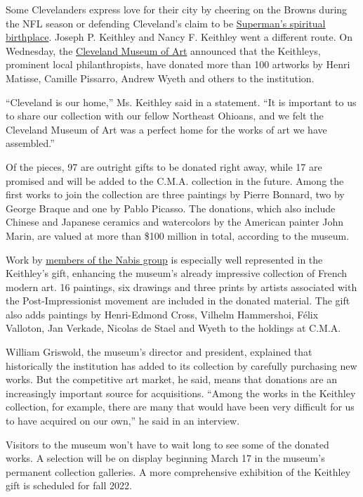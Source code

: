 Some Clevelanders express love for their city by cheering on the Browns
during the NFL season or defending Cleveland's claim to be
\href{https://www.nytimes3xbfgragh.onion/2008/09/02/us/02superman.html}{Superman's
spiritual birthplace}. Joseph P. Keithley and Nancy F. Keithley went a
different route. On Wednesday, the
\href{https://www.clevelandart.org/}{Cleveland Museum of Art} announced
that the Keithleys, prominent local philanthropists, have donated more
than 100 artworks by Henri Matisse, Camille Pissarro, Andrew Wyeth and
others to the institution.

``Cleveland is our home,'' Ms. Keithley said in a statement. ``It is
important to us to share our collection with our fellow Northeast
Ohioans, and we felt the Cleveland Museum of Art was a perfect home for
the works of art we have assembled.''

Of the pieces, 97 are outright gifts to be donated right away, while 17
are promised and will be added to the C.M.A. collection in the future.
Among the first works to join the collection are three paintings by
Pierre Bonnard, two by George Braque and one by Pablo Picasso. The
donations, which also include Chinese and Japanese ceramics and
watercolors by the American painter John Marin, are valued at more than
\$100 million in total, according to the museum.

Work by \href{https://www.clevelandart.org/art/1953.212}{members of the
Nabis group} is especially well represented in the Keithley's gift,
enhancing the museum's already impressive collection of French modern
art. 16 paintings, six drawings and three prints by artists associated
with the Post-Impressionist movement are included in the donated
material. The gift also adds paintings by Henri-Edmond Cross, Vilhelm
Hammershoi, Félix Valloton, Jan Verkade, Nicolas de Stael and Wyeth to
the holdings at C.M.A.

William Griswold, the museum's director and president, explained that
historically the institution has added to its collection by carefully
purchasing new works. But the competitive art market, he said, means
that donations are an increasingly important source for acquisitions.
``Among the works in the Keithley collection, for example, there are
many that would have been very difficult for us to have acquired on our
own,'' he said in an interview.

Visitors to the museum won't have to wait long to see some of the
donated works. A selection will be on display beginning March 17 in the
museum's permanent collection galleries. A more comprehensive exhibition
of the Keithley gift is scheduled for fall 2022.

